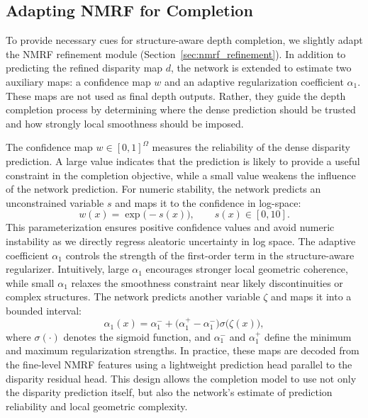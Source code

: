 \subsection{Adapting NMRF for Completion}
To provide necessary cues for structure-aware depth completion, we slightly adapt the NMRF refinement module (Section~\ref{sec:nmrf_refinement}).
In addition to predicting the refined disparity map $d$, the network is extended to estimate two auxiliary maps: a confidence map $w$ and an adaptive regularization coefficient $\alpha_1$.
These maps are not used as final depth outputs.
Rather, they guide the depth completion process by determining where the dense prediction should be trusted and how strongly local smoothness should be imposed.

The confidence map $w\in[0,1]^{\Omega}$ measures the reliability of the dense disparity prediction.
A large value indicates that the prediction is likely to provide a useful constraint in the completion objective, while a small value weakens the influence of the network prediction.
For numeric stability, the network predicts an unconstrained variable $s$ and maps it to the confidence in log-space:
\begin{equation}
	w(x)=\exp\bigl(-s(x)\bigr),
	\qquad
	s(x)\in[0,10].
\end{equation}
This parameterization ensures positive confidence values and avoid numeric instability as we directly regress aleatoric uncertainty in log space.
The adaptive coefficient $\alpha_1$ controls the strength of the first-order term in the structure-aware regularizer.
Intuitively, large $\alpha_1$ encourages stronger local geometric coherence, while small $\alpha_1$ relaxes the smoothness constraint near likely discontinuities or complex structures.
The network predicts another variable $\zeta$ and maps it into a bounded interval:
\begin{equation}
	\alpha_1(x)
	=
	\alpha_1^{-}
	+
	\bigl(\alpha_1^{+}-\alpha_1^{-}\bigr)
	\sigma\bigl(\zeta(x)\bigr),
	\label{eq:sadc-alpha}
\end{equation}
where $\sigma(\cdot)$ denotes the sigmoid function, and $\alpha_1^{-}$ and $\alpha_1^{+}$ define the minimum and maximum regularization strengths.
In practice, these maps are decoded from the fine-level NMRF features using a lightweight prediction head parallel to the disparity residual head.
This design allows the completion model to use not only the disparity prediction itself, but also the network's estimate of prediction reliability and local geometric complexity.

